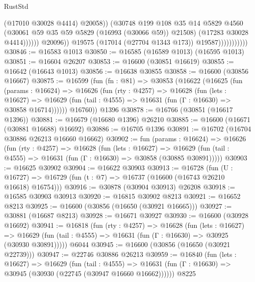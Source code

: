 \begin{lexlean}{RustStd}
\begin{coremodule}
                                          (@17010 @30028 @4414)
                                          @20058))
                                      (@30748
                                        @199
                                        @108
                                        @35
                                        @14
                                        @5829
                                        @4560
                                        (@30061 @59 @35 @59 @5829 (@16993 (@30066 @59)) @21508)
                                        (@17283 @30028 @4414))))))
                              @20096))
                          @19575
                          (@17014 (@27704 @1343 @173))
                          @19587)))))))))))
@30846 := @16583 @1013
@30850 := @16585 (@16589 @1013) (@16595 @1013)
@30851 := @16604 @26207
@30853 := @16600 (@30851 @16619)
@30855 := @16642 (@16643 @1013)
@30856 := @16638 @30855
@30858 := @16600 (@30856 @16667)
@30875 := @16599
    (fun (fn : @81) =>
    @30853
      (@16622
        (@16625
          (fun (params : @16624) =>
          @16626
            (fun (rty : @4257) =>
            @16628
              (fun (lets : @16627) =>
              @16629 (fun (tail : @4555) => @16631 (fun (Γ : @16630) => @30858 @16714))))))
        @16760))
    @1396
@30878 := @16766 (@30851 (@16617 @1396))
@30881 := @16679 (@16680 @1396) @26210
@30885 := @16600 (@16671 (@30881 @16688) @16692)
@30886 := @16705 @1396
@30891 := @16702 (@16704 @30886 @26213 @16660 @16662)
@30902 := fun (params : @16624) =>
  @16626
    (fun (rty : @4257) =>
    @16628
      (fun (lets : @16627) =>
      @16629 (fun (tail : @4555) => @16631 (fun (Γ : @16630) => @30858 (@30885 @30891)))))
@30903 := @16625 @30902
@30904 := @16622 @30903
@30913 := @16728
    (fun (U : @16727) => @16729 (fun (t : @7) => @16737 (@16600 (@16743 @26210 @16618) @16754)))
@30916 := @30878 (@30904 @30913) @26208
@30918 := @16585 @30903 @30913
@30920 := @16815 @30902 @8213
@30921 := @16652 @8213
@30925 := @16600 (@30856 (@16650 (@30921 @16665)))
@30927 := @30881 (@16687 @8213)
@30928 := @16671 @30927
@30930 := @16600 (@30928 @16692)
@30941 := @16818
    (fun (rty : @4257) =>
    @16628
      (fun (lets : @16627) =>
      @16629 (fun (tail : @4555) => @16631 (fun (Γ : @16630) => @30925 (@30930 @30891)))))
    @6044
@30945 := @16600 (@30856 (@16650 (@30921 @22739)))
@30947 := @22746 @30886 @26213
@30959 := @16840
    (fun (lets : @16627) =>
    @16629
      (fun (tail : @4555) =>
      @16631 (fun (Γ : @16630) => @30945 (@30930 (@22745 (@30947 @16660 @16662))))))
    @8225

\end{coremodule}
\end{lexlean}
